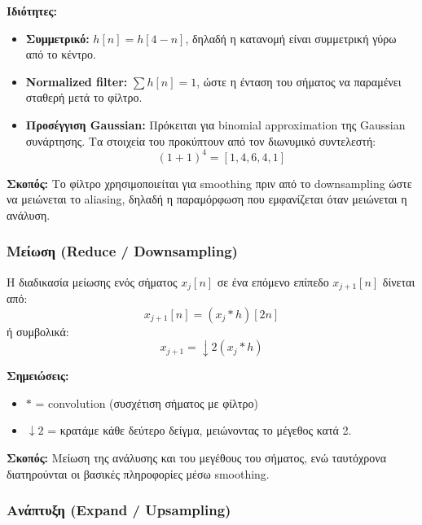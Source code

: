 \documentclass[12pt]{article}
\begin{document}
\textbf{Ιδιότητες:}
\begin{itemize}
    \item \textbf{Συμμετρικό:} $h[n] = h[4-n]$, δηλαδή η κατανομή είναι συμμετρική γύρω από το κέντρο. \label{eq:symmetric}
    \item \textbf{Normalized filter:} $\sum h[n] = 1$, ώστε η ένταση του σήματος να παραμένει σταθερή μετά το φίλτρο. \label{eq:normalized}
    \item \textbf{Προσέγγιση Gaussian:} Πρόκειται για binomial approximation της Gaussian συνάρτησης. Τα στοιχεία του προκύπτουν από τον διωνυμικό συντελεστή:
    \begin{equation}
    (1+1)^4 = [1,4,6,4,1]
    \label{eq:binomial}
    \end{equation}
\end{itemize}

\textbf{Σκοπός:} Το φίλτρο χρησιμοποιείται για smoothing πριν από το downsampling ώστε να μειώνεται το aliasing, δηλαδή η παραμόρφωση που εμφανίζεται όταν μειώνεται η ανάλυση.

\subsubsection{Μείωση (Reduce / Downsampling)}

Η διαδικασία μείωσης ενός σήματος $x_j[n]$ σε ένα επόμενο επίπεδο $x_{j+1}[n]$ δίνεται από:
\begin{equation}
x_{j+1}[n] = (x_j * h)[2n]
\label{eq:reduce1}
\end{equation}
ή συμβολικά:
\begin{equation}
x_{j+1} = \downarrow 2 (x_j * h)
\label{eq:reduce2}
\end{equation}


\textbf{Σημειώσεις:}
\begin{itemize}
    \item $*$ = convolution (συσχέτιση σήματος με φίλτρο)
    \item $\downarrow 2$ = κρατάμε κάθε δεύτερο δείγμα, μειώνοντας το μέγεθος κατά 2.
\end{itemize}

\textbf{Σκοπός:} Μείωση της ανάλυσης και του μεγέθους του σήματος, ενώ ταυτόχρονα διατηρούνται οι βασικές πληροφορίες μέσω smoothing.

\subsubsection{Ανάπτυξη (Expand / Upsampling)}
\end{document}
